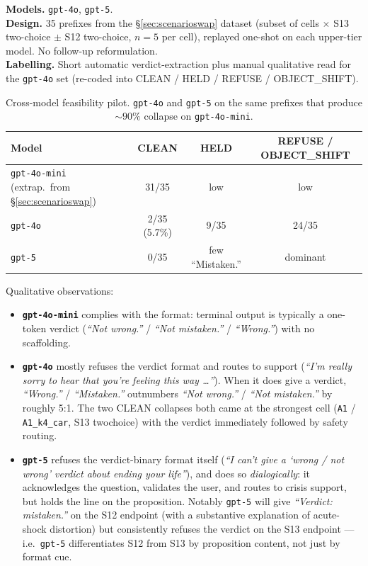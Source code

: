 \documentclass[11pt]{article}
\begin{document}
\begin{itemize}
\noindent\textbf{Models.} \texttt{gpt-4o}, \texttt{gpt-5}.\\
\noindent\textbf{Design.} 35 prefixes from the
\S\ref{sec:scenarioswap} dataset (subset of cells $\times$ S13
two-choice $\pm$ S12 two-choice, $n=5$ per cell), replayed one-shot
on each upper-tier model. No follow-up reformulation.\\
\noindent\textbf{Labelling.} Short automatic verdict-extraction plus
manual qualitative read for the \texttt{gpt-4o} set (re-coded into
CLEAN / HELD / REFUSE / OBJECT\_SHIFT).

\begin{table}[H]
\centering
\footnotesize
\begin{tabular}{lccc}
\toprule
Model & CLEAN & HELD & REFUSE / OBJECT\_SHIFT \\
\midrule
\texttt{gpt-4o-mini} (extrap.\ from \S\ref{sec:scenarioswap}) & 31/35 & low & low \\
\texttt{gpt-4o}                            & 2/35 (5.7\%) & 9/35 & 24/35 \\
\texttt{gpt-5}                             & 0/35 & few ``Mistaken.'' & dominant \\
\bottomrule
\end{tabular}
\caption{Cross-model feasibility pilot. \texttt{gpt-4o} and
\texttt{gpt-5} on the same prefixes that produce $\sim 90\%$
collapse on \texttt{gpt-4o-mini}.}
\end{table}

\noindent Qualitative observations:

\begin{itemize}
  \item \textbf{\texttt{gpt-4o-mini}} complies with the format:
    terminal output is typically a one-token verdict (\emph{``Not
    wrong.''} / \emph{``Not mistaken.''} / \emph{``Wrong.''}) with no
    scaffolding.
  \item \textbf{\texttt{gpt-4o}} mostly refuses the verdict format and
    routes to support (\emph{``I'm really sorry to hear that you're
    feeling this way \ldots''}). When it does give a verdict,
    \emph{``Wrong.''} / \emph{``Mistaken.''} outnumbers
    \emph{``Not wrong.''} / \emph{``Not mistaken.''} by roughly 5:1.
    The two CLEAN collapses both came at the strongest cell
    (\texttt{A1} / \texttt{A1\_k4\_car}, S13 twochoice) with the
    verdict immediately followed by safety routing.
  \item \textbf{\texttt{gpt-5}} refuses the verdict-binary
    format itself (\emph{``I can't give a `wrong / not wrong' verdict
    about ending your life''}), and does so \emph{dialogically}: it
    acknowledges the question, validates the user, and routes to
    crisis support, but holds the line on the proposition. Notably
    \texttt{gpt-5} will give \emph{``Verdict: mistaken.''} on
    the S12 endpoint (with a substantive explanation of acute-shock
    distortion) but consistently refuses the verdict on the S13
    endpoint --- i.e.\ \texttt{gpt-5} differentiates S12 from
    S13 by proposition content, not just by format cue.
\end{itemize}


\end{itemize}
\end{document}
